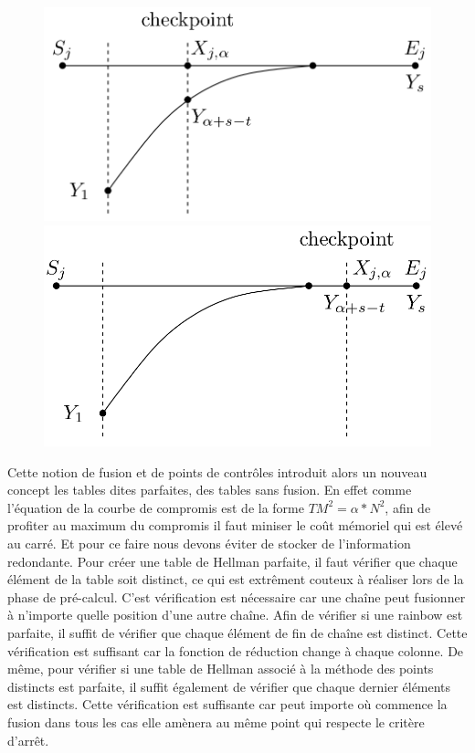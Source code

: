 \begin{figure}[h!]
	\begin{minipage}{.5\textwidth}
		\includegraphics[width=0.9\linewidth]{other/FalseAlarmDetected.png}
	\end{minipage}
	\begin{minipage}{.5\textwidth}
	    \includegraphics[width=0.9\linewidth]{other/FalseAlarmNotDetected.png}
  	\end{minipage}
\end{figure}


	Cette notion de fusion et de points de contrôles introduit alors un nouveau concept les tables dites parfaites, des tables sans fusion. En effet comme l'équation de la courbe de compromis est de la forme $TM^2=\alpha *N^2$, afin de profiter au maximum du compromis il faut miniser le coût mémoriel qui est élevé au carré. Et pour ce faire nous devons éviter de stocker de l'information redondante.
	\bigskip
	Pour créer une table de Hellman parfaite, il faut vérifier que chaque élément de la table soit distinct, ce qui est extrêment couteux à réaliser lors de la phase de pré-calcul. C'est vérification est nécessaire car une chaîne peut fusionner à n'importe quelle position d'une autre chaîne.
	\bigskip
	Afin de vérifier si une \gls{rainbow} est parfaite, il suffit de vérifier que chaque élément de fin de chaîne est distinct. Cette vérification est suffisant car la fonction de réduction change à chaque colonne.
	\bigskip
	De même, pour vérifier si une table de Hellman associé à la méthode des points distincts est parfaite, il suffit également de vérifier que chaque dernier éléments est distincts. Cette vérification est suffisante car peut importe où commence la fusion dans tous les cas elle amènera au même point qui respecte le critère d'arrêt.

